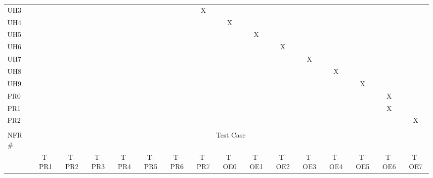 \documentclass[12pt, titlepage]{article}
\begin{document}
\begin{longtable}{llllllllllllllll}
\multicolumn{1}{l|}{UH3} & \multicolumn{1}{c}{} & \multicolumn{1}{c}{} & \multicolumn{1}{c}{} & \multicolumn{1}{c}{} & \multicolumn{1}{c}{} &  & \multicolumn{1}{c}{X} &  &  &  &  &  &  &  &  \\
\multicolumn{1}{l|}{UH4} & \multicolumn{1}{c}{} & \multicolumn{1}{c}{} & \multicolumn{1}{c}{} & \multicolumn{1}{c}{} & \multicolumn{1}{c}{} &  &  & \multicolumn{1}{c}{X} &  &  &  &  &  &  &  \\
\multicolumn{1}{l|}{UH5} &  &  &  &  &  &  &  &  & \multicolumn{1}{c}{X} & \multicolumn{1}{c}{} & \multicolumn{1}{c}{} & \multicolumn{1}{c}{} & \multicolumn{1}{c}{} & \multicolumn{1}{c}{} & \multicolumn{1}{c}{} \\
\multicolumn{1}{l|}{UH6} &  &  &  &  &  &  &  &  & \multicolumn{1}{c}{} & \multicolumn{1}{c}{X} & \multicolumn{1}{c}{} & \multicolumn{1}{c}{} & \multicolumn{1}{c}{} & \multicolumn{1}{c}{} & \multicolumn{1}{c}{} \\
\multicolumn{1}{l|}{UH7} &  &  &  &  &  &  &  &  & \multicolumn{1}{c}{} & \multicolumn{1}{c}{} & \multicolumn{1}{c}{X} & \multicolumn{1}{c}{} & \multicolumn{1}{c}{} & \multicolumn{1}{c}{} & \multicolumn{1}{c}{} \\
\multicolumn{1}{l|}{UH8} &  &  &  &  &  &  &  &  & \multicolumn{1}{c}{} & \multicolumn{1}{c}{} & \multicolumn{1}{c}{} & \multicolumn{1}{c}{X} & \multicolumn{1}{c}{} & \multicolumn{1}{c}{} & \multicolumn{1}{c}{} \\
\multicolumn{1}{l|}{UH9} &  &  &  &  &  &  &  &  & \multicolumn{1}{c}{} & \multicolumn{1}{c}{} & \multicolumn{1}{c}{} & \multicolumn{1}{c}{} & \multicolumn{1}{c}{X} & \multicolumn{1}{c}{} & \multicolumn{1}{c}{} \\
\multicolumn{1}{l|}{PR0} &  &  &  &  &  &  &  &  & \multicolumn{1}{c}{} & \multicolumn{1}{c}{} & \multicolumn{1}{c}{} & \multicolumn{1}{c}{} & \multicolumn{1}{c}{} & \multicolumn{1}{c}{X} & \multicolumn{1}{c}{} \\
\multicolumn{1}{l|}{PR1} &  &  &  &  &  &  &  &  & \multicolumn{1}{c}{} & \multicolumn{1}{c}{} & \multicolumn{1}{c}{} & \multicolumn{1}{c}{} & \multicolumn{1}{c}{} & \multicolumn{1}{c}{X} & \multicolumn{1}{c}{} \\
\multicolumn{1}{l|}{PR2} &  &  &  &  &  &  &  &  &  &  &  &  &  &  & \multicolumn{1}{c}{X} \\
 &  &  &  &  &  &  &  &  &  &  &  &  &  &  &  \\
\multicolumn{1}{l|}{NFR \#} & \multicolumn{15}{c}{Test Case} \\ \hline
\multicolumn{1}{l|}{} & \multicolumn{1}{c}{T-PR1} & \multicolumn{1}{c}{T-PR2} & \multicolumn{1}{c}{T-PR3} & \multicolumn{1}{c}{T-PR4} & \multicolumn{1}{c}{T-PR5} & \multicolumn{1}{c}{T-PR6} & \multicolumn{1}{c}{T-PR7} & \multicolumn{1}{c}{T-OE0} & \multicolumn{1}{c}{T-OE1} & \multicolumn{1}{c}{T-OE2} & \multicolumn{1}{c}{T-OE3} & \multicolumn{1}{c}{T-OE4} & \multicolumn{1}{c}{T-OE5} & \multicolumn{1}{c}{T-OE6} & \multicolumn{1}{c}{T-OE7} \\

\end{longtable}
\end{document}
